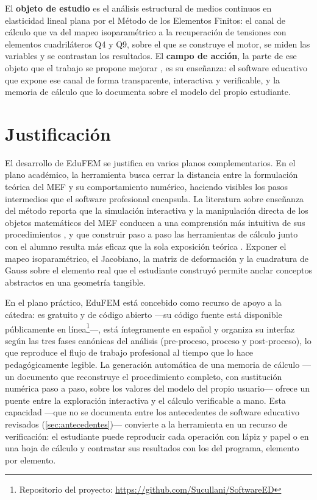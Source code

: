 El \textbf{objeto de estudio} \autocite[p.~8]{alvarez_metodologia} es el análisis estructural de medios continuos en elasticidad lineal plana por el Método de los Elementos Finitos: el canal de cálculo que va del mapeo isoparamétrico a la recuperación de tensiones con elementos cuadriláteros Q4 y Q9, sobre el que se construye el motor, se miden las variables y se contrastan los resultados. El \textbf{campo de acción}, la parte de ese objeto que el trabajo se propone mejorar \autocite[p.~13]{alvarez_metodologia}, es su enseñanza: el software educativo que expone ese canal de forma transparente, interactiva y verificable, y la memoria de cálculo que lo documenta sobre el modelo del propio estudiante.

\section*{Justificación}

El desarrollo de EduFEM se justifica en varios planos complementarios. En el plano académico, la herramienta busca cerrar la distancia entre la formulación teórica del MEF y su comportamiento numérico, haciendo visibles los pasos intermedios que el software profesional encapsula. La literatura sobre enseñanza del método reporta que la simulación interactiva y la manipulación directa de los objetos matemáticos del MEF conducen a una comprensión más intuitiva de sus procedimientos \autocites[p.~157]{lee2015interactive}[pp.~872, 874]{lee2015eigenmodes}, y que construir paso a paso las herramientas de cálculo junto con el alumno resulta más eficaz que la sola exposición teórica \autocite[p.~17]{bishay2020teaching}. Exponer el mapeo isoparamétrico, el Jacobiano, la matriz de deformación y la cuadratura de Gauss sobre el elemento real que el estudiante construyó permite anclar conceptos abstractos en una geometría tangible.

En el plano práctico, EduFEM está concebido como recurso de apoyo a la cátedra: es gratuito y de código abierto —su código fuente está disponible públicamente en línea\footnote{Repositorio del proyecto: \url{https://github.com/Sucullani/SoftwareED}}—, está íntegramente en español y organiza su interfaz según las tres fases canónicas del análisis (pre-proceso, proceso y post-proceso), lo que reproduce el flujo de trabajo profesional al tiempo que lo hace pedagógicamente legible. La generación automática de una memoria de cálculo —un documento que reconstruye el procedimiento completo, con sustitución numérica paso a paso, sobre los valores del modelo del propio usuario— ofrece un puente entre la exploración interactiva y el cálculo verificable a mano. Esta capacidad —que no se documenta entre los antecedentes de software educativo revisados (\autoref{sec:antecedentes})— convierte a la herramienta en un recurso de verificación: el estudiante puede reproducir cada operación con lápiz y papel o en una hoja de cálculo y contrastar sus resultados con los del programa, elemento por elemento.

